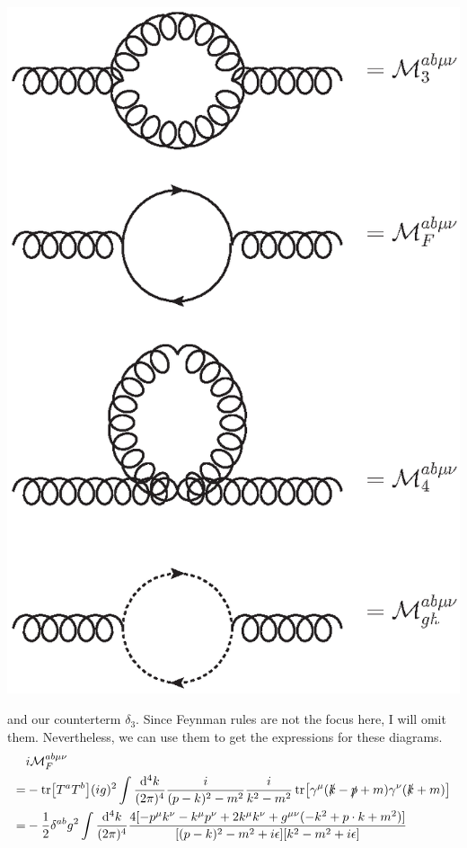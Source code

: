 \documentclass[a4paper,12pt]{article}
\renewcommand{\d}{\mathrm{d}}
\begin{document}
\begin{center}
    \includegraphics{rgf/gluonse.eps}
\end{center}
and our counterterm $\delta_3$. Since Feynman rules are not the focus here, I will omit them. Nevertheless, we can use them to get the expressions for these diagrams.
\begin{equation}
    \begin{split}
        &i\mathcal{M}_{F}^{ab \mu \nu}\\
        =&-\tr[T^{a}T^{b}](ig)^{2}\int\frac{\d^{4}k}{(2\pi)^{4}}\frac{i}{(p-k)^{2}-m^{2}}\frac{i}{k^{2}-m^{2}}\tr[\gamma^{\mu}(\slashed k-\slashed p+m)\gamma^{\nu}(\slashed k+m)]\\
        =&-\frac{1}{2}\delta^{ab}g^2\int\frac{\d^{4}k}{(2\pi)^{4}}\frac{4[-p^{\mu}k^{\nu}-k^{\mu}p^{\nu}+2k^{\mu}k^{\nu}+g^{\mu\nu}(-k^{2}+p\cdot k+m^{2})]}{[(p-k)^{2}-m^{2}+i \epsilon][k^{2}-m^{2}+i \epsilon]}
    \end{split}
\end{equation}
\end{document}
